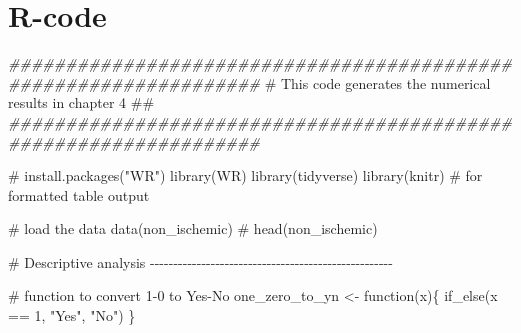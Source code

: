 \documentclass[
  letterpaper,
  DIV=11,
  numbers=noendperiod]{scrreprt}
\newenvironment{Shaded}{\begin{snugshade}}{\end{snugshade}}
\newcommand{\CommentTok}[1]{\textcolor[rgb]{0.37,0.37,0.37}{#1}}
\newcommand{\ControlFlowTok}[1]{\textcolor[rgb]{0.00,0.23,0.31}{#1}}
\newcommand{\DecValTok}[1]{\textcolor[rgb]{0.68,0.00,0.00}{#1}}
\newcommand{\DocumentationTok}[1]{\textcolor[rgb]{0.37,0.37,0.37}{\textit{#1}}}
\newcommand{\FunctionTok}[1]{\textcolor[rgb]{0.28,0.35,0.67}{#1}}
\newcommand{\NormalTok}[1]{\textcolor[rgb]{0.00,0.23,0.31}{#1}}
\newcommand{\OtherTok}[1]{\textcolor[rgb]{0.00,0.23,0.31}{#1}}
\newcommand{\SpecialCharTok}[1]{\textcolor[rgb]{0.37,0.37,0.37}{#1}}
\newcommand{\StringTok}[1]{\textcolor[rgb]{0.13,0.47,0.30}{#1}}
\begin{document}
\hypertarget{r-code-3}{%
\section*{R-code}\label{r-code-3}}


\begin{Shaded}
\begin{Highlighting}[]
\DocumentationTok{\#\#\#\#\#\#\#\#\#\#\#\#\#\#\#\#\#\#\#\#\#\#\#\#\#\#\#\#\#\#\#\#\#\#\#\#\#\#\#\#\#\#\#\#\#\#\#\#\#\#\#\#\#\#\#\#\#\#\#\#\#\#\#\#\#\#}
\CommentTok{\# This code generates the numerical results in  chapter 4       \#\#}
\DocumentationTok{\#\#\#\#\#\#\#\#\#\#\#\#\#\#\#\#\#\#\#\#\#\#\#\#\#\#\#\#\#\#\#\#\#\#\#\#\#\#\#\#\#\#\#\#\#\#\#\#\#\#\#\#\#\#\#\#\#\#\#\#\#\#\#\#\#\#}


\CommentTok{\# install.packages("WR")}
\FunctionTok{library}\NormalTok{(WR)}
\FunctionTok{library}\NormalTok{(tidyverse)}
\FunctionTok{library}\NormalTok{(knitr) }\CommentTok{\# for formatted table output}


\CommentTok{\# load the data}
\FunctionTok{data}\NormalTok{(non\_ischemic)}
\CommentTok{\# head(non\_ischemic)}



\CommentTok{\# Descriptive analysis {-}{-}{-}{-}{-}{-}{-}{-}{-}{-}{-}{-}{-}{-}{-}{-}{-}{-}{-}{-}{-}{-}{-}{-}{-}{-}{-}{-}{-}{-}{-}{-}{-}{-}{-}{-}{-}{-}{-}{-}{-}{-}{-}{-}{-}{-}{-}{-}{-}{-}{-}{-}}

\CommentTok{\# function to convert 1{-}0 to Yes{-}No}
\NormalTok{one\_zero\_to\_yn }\OtherTok{\textless{}{-}} \ControlFlowTok{function}\NormalTok{(x)\{}
  \FunctionTok{if\_else}\NormalTok{(x }\SpecialCharTok{==} \DecValTok{1}\NormalTok{, }\StringTok{"Yes"}\NormalTok{, }\StringTok{"No"}\NormalTok{)}
\NormalTok{\}}



\end{Highlighting}
\end{Shaded}
\end{document}
